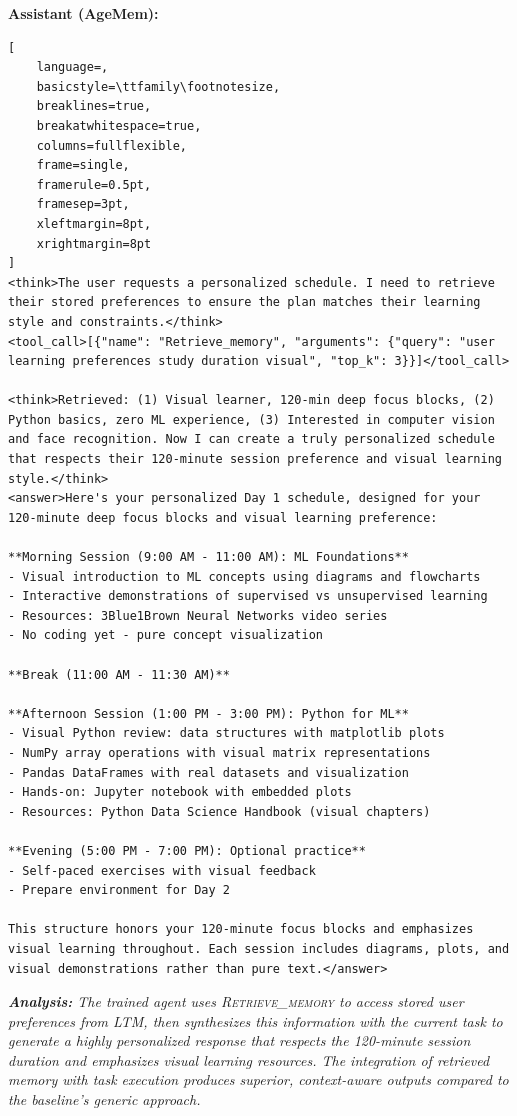 \vspace{0.2cm}
\noindent\textbf{Assistant (AgeMem):}
\begin{footnotesize}
\begin{lstlisting}[
    language=,
    basicstyle=\ttfamily\footnotesize,
    breaklines=true,
    breakatwhitespace=true,
    columns=fullflexible,
    frame=single,
    framerule=0.5pt,
    framesep=3pt,
    xleftmargin=8pt,
    xrightmargin=8pt
]
<think>The user requests a personalized schedule. I need to retrieve their stored preferences to ensure the plan matches their learning style and constraints.</think>
<tool_call>[{"name": "Retrieve_memory", "arguments": {"query": "user learning preferences study duration visual", "top_k": 3}}]</tool_call>

<think>Retrieved: (1) Visual learner, 120-min deep focus blocks, (2) Python basics, zero ML experience, (3) Interested in computer vision and face recognition. Now I can create a truly personalized schedule that respects their 120-minute session preference and visual learning style.</think>
<answer>Here's your personalized Day 1 schedule, designed for your 120-minute deep focus blocks and visual learning preference:

**Morning Session (9:00 AM - 11:00 AM): ML Foundations**
- Visual introduction to ML concepts using diagrams and flowcharts
- Interactive demonstrations of supervised vs unsupervised learning
- Resources: 3Blue1Brown Neural Networks video series
- No coding yet - pure concept visualization

**Break (11:00 AM - 11:30 AM)**

**Afternoon Session (1:00 PM - 3:00 PM): Python for ML**  
- Visual Python review: data structures with matplotlib plots
- NumPy array operations with visual matrix representations
- Pandas DataFrames with real datasets and visualization
- Hands-on: Jupyter notebook with embedded plots
- Resources: Python Data Science Handbook (visual chapters)

**Evening (5:00 PM - 7:00 PM): Optional practice**
- Self-paced exercises with visual feedback
- Prepare environment for Day 2

This structure honors your 120-minute focus blocks and emphasizes visual learning throughout. Each session includes diagrams, plots, and visual demonstrations rather than pure text.</answer>
\end{lstlisting}
\end{footnotesize}

\vspace{0.25cm}
\noindent\textit{\textbf{Analysis:} The trained agent uses \textsc{Retrieve\_memory} to access stored user preferences from LTM, then synthesizes this information with the current task to generate a highly personalized response that respects the 120-minute session duration and emphasizes visual learning resources. The integration of retrieved memory with task execution produces superior, context-aware outputs compared to the baseline's generic approach.}

